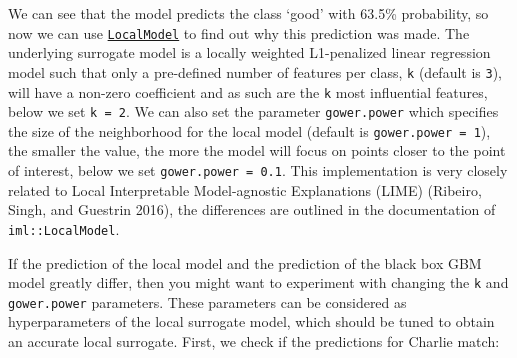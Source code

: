 We can see that the model predicts the class `good' with 63.5\%
probability, so now we can use
\href{https://www.rdocumentation.org/packages/iml/topics/LocalModel}{\texttt{LocalModel}}
to find out why this prediction was made. The underlying surrogate model
is a locally weighted L1-penalized linear regression model such that
only a pre-defined number of features per class, \texttt{k} (default is
\texttt{3}), will have a non-zero coefficient and as such are the
\texttt{k} most influential features, below we set \texttt{k\ =\ 2}. We
can also set the parameter \texttt{gower.power} which specifies the size
of the neighborhood for the local model (default is
\texttt{gower.power\ =\ 1}), the smaller the value, the more the model
will focus on points closer to the point of interest, below we set
\texttt{gower.power\ =\ 0.1}. This implementation is very closely
related to Local Interpretable Model-agnostic Explanations
(LIME) (Ribeiro, Singh, and Guestrin 2016), the differences
are outlined in the documentation of \texttt{iml::LocalModel}.

\begin{Shaded}
\begin{Highlighting}[]
\SpecialCharTok{$}\OtherTok{=}  
\OtherTok{=}\SpecialCharTok{$} \NormalTok{,}
   \NormalTok{)}
\end{Highlighting}
\end{Shaded}

If the prediction of the local model and the prediction of the black box
GBM model greatly differ, then you might want to experiment with
changing the \texttt{k} and \texttt{gower.power} parameters. These
parameters can be considered as hyperparameters of the local surrogate
model, which should be tuned to obtain an accurate local surrogate.
First, we check if the predictions for Charlie match:

\begin{Shaded}
\begin{Highlighting}[]
\NormalTok{(}\NormalTok{ gbm\_predict[[}\NormalTok{]], }\SpecialCharTok{$}\NormalTok{()[[}\NormalTok{]])}
\end{Highlighting}
\end{Shaded}

